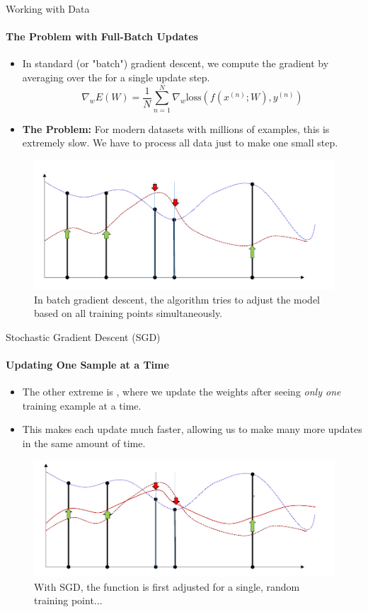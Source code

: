 \begin{frame}{Working with Data}
    \framesubtitle{The Problem with Full-Batch Updates}
    \begin{itemize}
        \item In standard (or "batch") gradient descent, we compute the gradient by averaging over the  for a single update step.
        \[ \nabla_{w}E(W) = \frac{1}{N} \sum_{n=1}^{N} \nabla_{w}\text{loss}(f(x^{(n)}; W), y^{(n)}) \]
        \item \textbf{The Problem:} For modern datasets with millions of examples, this is extremely slow. We have to process all data just to make one small step.
    \end{itemize}
    \begin{figure}
        \centering
        \includegraphics[width=0.7\linewidth]{images/full_batch_idea.png}
        \caption{In batch gradient descent, the algorithm tries to adjust the model based on all training points simultaneously.}
    \end{figure}
\end{frame}

\begin{frame}{Stochastic Gradient Descent (SGD)}
    \framesubtitle{Updating One Sample at a Time}
    \begin{itemize}
        \item The other extreme is , where we update the weights after seeing \emph{only one} training example at a time.
        \item This makes each update much faster, allowing us to make many more updates in the same amount of time.
    \end{itemize}
    \begin{figure}
        \centering
        \includegraphics[width=0.7\linewidth]{images/sgd_step_1.png}
        \caption{With SGD, the function is first adjusted for a single, random training point...}
    \end{figure}
\end{frame}

